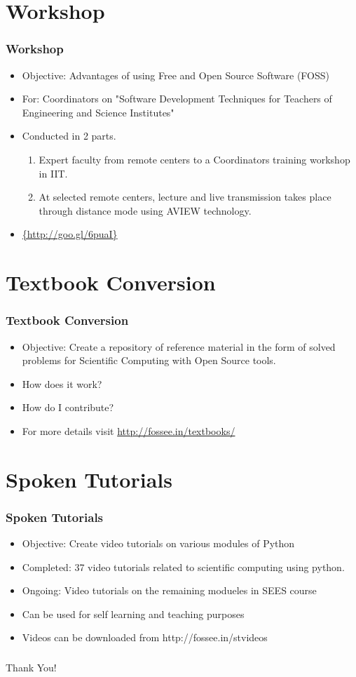 \documentclass{beamer}
\begin{document}
\section{Workshop}

\begin{frame}
  \frametitle{Workshop}
  \begin{itemize}
  \item Objective: Advantages of using Free and Open Source Software (FOSS)
  \item For: Coordinators on "Software Development Techniques for Teachers of Engineering and Science Institutes"
  \item Conducted in 2 parts.
  \begin{enumerate}
  \item Expert faculty from remote centers to a Coordinators training workshop in IIT.
  \item At selected remote centers, lecture and live transmission takes place through distance mode using AVIEW technology. 
  \end{enumerate}
  \item \url{{http://goo.gl/6puaI}}
  \end{itemize}
\end{frame}


\section{Textbook Conversion}

\begin{frame}	
	\frametitle{Textbook Conversion}
	\begin{itemize}
	\item Objective: Create a repository of reference material in the form of solved problems for Scientific Computing with Open Source tools.
	\item How does it work?
	\item How do I contribute?
	\item For more details visit {\url{http://fossee.in/textbooks/}}
	\end{itemize}
\end{frame}

\section{Spoken Tutorials}

\begin{frame}
	\frametitle{Spoken Tutorials}
	\begin{itemize}
	\item Objective: Create video tutorials on various modules of Python
	\item Completed: 37 video tutorials related to scientific computing using python.
	\item Ongoing: Video tutorials on the remaining modueles in SEES course
	\item Can be used for self learning and teaching purposes
	\item Videos can be downloaded from http://fossee.in/stvideos	
	\end{itemize}
\end{frame}


\begin{frame}
\frametitle{}   
  \begin{center}
    \Huge{Thank You!}
  \end{center}
\end{frame}
\end{document}
